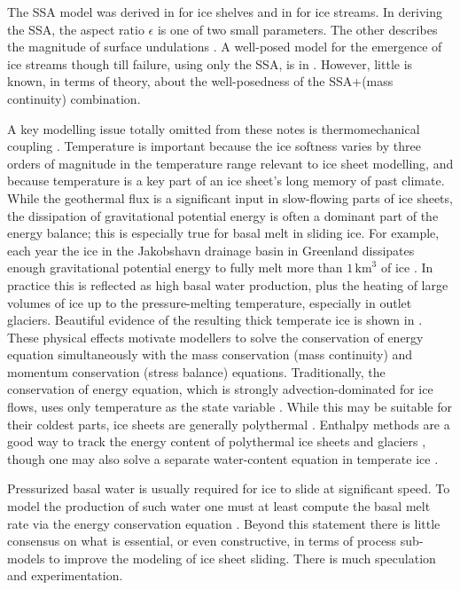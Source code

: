 \documentclass[letterpaper,final,12pt,reqno]{amsart}
\newcommand{\eps}{\epsilon}
\begin{document}
The SSA model \cite{WeisGreveHutter} was derived in \cite{Morland} for ice shelves and in \cite{MacAyeal} for ice streams.  In deriving the SSA, the aspect ratio $\eps$ is one of two small parameters.  The other describes the magnitude of surface undulations \cite{SchoofStream,SchoofHindmarsh}.  A well-posed model for the emergence of ice streams though till failure, using only the SSA, is in \cite{SchoofStream}.  However, little is known, in terms of theory, about the well-posedness of the SSA+(mass continuity) combination.

A key modelling issue totally omitted from these notes is thermomechanical coupling \cite{Blatteretal2010}.  Temperature is important because the ice softness varies by three orders of magnitude in the temperature range relevant to ice sheet modelling, and because temperature is a key part of an ice sheet's long memory of past climate.  While the geothermal flux is a significant input in slow-flowing parts of ice sheets, the dissipation of gravitational potential energy is often a dominant part of the energy balance; this is especially true for basal melt in sliding ice.  For example, each year the ice in the Jakobshavn drainage basin in Greenland dissipates enough gravitational potential energy to fully melt more than $1\,\text{km}^3$ of ice \cite{AschwandenBuelerKhroulevBlatter}.  In practice this is reflected as high basal water production, plus the heating of large volumes of ice up to the pressure-melting temperature, especially in outlet glaciers.  Beautiful evidence of the resulting thick temperate ice is shown in \cite{Luethietal2009}.  These physical effects motivate modellers to solve the conservation of energy equation simultaneously with the mass conservation (mass continuity) and momentum conservation (stress balance) equations.  Traditionally, the conservation of energy equation, which is strongly advection-dominated for ice flows, uses only temperature as the state variable \cite{BBL}.  While this may be suitable for their coldest parts, ice sheets are generally polythermal \cite{FowlerLarson1978,Greve}.  Enthalpy methods are a good way to track the energy content of polythermal ice sheets and glaciers \cite{AschwandenBuelerKhroulevBlatter,GreveBlatter2016}, though one may also solve a separate water-content equation in temperate ice \cite{Greve}.

Pressurized basal water is usually required for ice to slide at significant speed.  To model the production of such water one must at least compute the basal melt rate via the energy conservation equation \cite{BBssasliding,BuelervanPelt2015,Clarke05,Raymondenergy,Tulaczyketal2000b}.  Beyond this statement there is little consensus on what is essential, or even constructive, in terms of process sub-models to improve the modeling of ice sheet sliding.  There is much speculation and experimentation.
\end{document}
